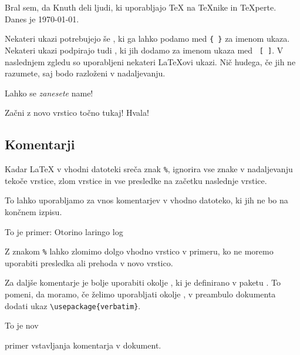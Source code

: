 \begin{example}
Bral sem, da Knuth deli ljudi,
ki uporabljajo \TeX{} na
\TeX{}nike in \TeX perte.\\
Danes je \today.
\end{example}

Nekateri ukazi potrebujejo še , ki ga lahko podamo med 
 \verb|{ }| za imenom ukaza. Nekateri ukazi podpirajo tudi
, ki jih dodamo za imenom ukaza med 
~\verb|[ ]|. V naslednjem zgledu so uporabljeni nekateri \LaTeX{}ovi
ukazi. Nič hudega, če jih ne razumete, saj bodo razloženi v nadaljevanju.

\begin{example}
Lahko se \textsl{zanesete} name!
\end{example}
\begin{example}
Začni z novo vrstico
točno tukaj!\newline
Hvala!
\end{example}

\subsection{Komentarji}

Kadar \LaTeX{} v vhodni datoteki sreča znak \verb|%|,
ignorira vse znake v nadaljevanju tekoče vrstice, zlom vrstice in vse presledke na začetku naslednje vrstice.

To lahko uporabljamo za vnos komentarjev v vhodno datoteko,
ki jih ne bo na končnem izpisu.

\begin{example}
To je  %
primer: Otorino%
              laringo%
    log
\end{example}

Z znakom \texttt{\%} lahko zlomimo dolgo vhodno vrstico v primeru,
ko ne moremo uporabiti presledka ali prehoda v novo vrstico.

Za daljše komentarje je bolje uporabiti okolje , 
ki je definirano v paketu . To pomeni, da moramo, 
če želimo uporabljati okolje , v preambulo dokumenta dodati ukaz
\verb|\usepackage{verbatim}|.

\begin{example}
To je nov
\begin{comment}
precej neumen,
a koristen
\end{comment}
primer vstavljanja
komentarja v dokument.
\end{example}

